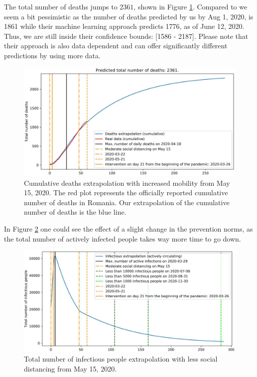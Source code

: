 \documentclass[11pt]{article}
\begin{document}
The total number of deaths jumps to $2361$, shown in Figure \ref{cum-deaths-extrapolation-second-wave}. Compared to \cite{Youyanggu} we seem a bit pessimistic as the number of deaths predicted by us by Aug 1, 2020, is 1861 while their machine learning approach predicts 1776, as of June 12, 2020. Thus, we are still inside their confidence bounds: [1586 - 2187]. Please note that their approach is also data dependent and can offer significantly different predictions by using more data. 

\begin{figure}[H]
  \centering
  \includegraphics[width=0.8\linewidth]{figs/moderate/2020-5-21_4_secondary_wave-cumulative_deaths_extrapolation.pdf}
  \caption{Cumulative deaths extrapolation with increased mobility from May 15, 2020. The red plot represents the officially reported cumulative number of deaths in Romania. Our extrapolation of the cumulative number of deaths is the blue line.}
  \label{cum-deaths-extrapolation-second-wave}
\end{figure}

In Figure \ref{infectious-extrapolation-second-wave} one could see the effect of a slight change in the prevention norms, as the total number of actively infected people takes way more time to go down.

\begin{figure}[H]
  \centering
  \includegraphics[width=0.8\linewidth]{figs/moderate/2020-5-21_4_secondary_wave-infectious.pdf}
  \caption{Total number of infectious people extrapolation with less social distancing from May 15, 2020.}
  \label{infectious-extrapolation-second-wave}
\end{figure}
\end{document}
